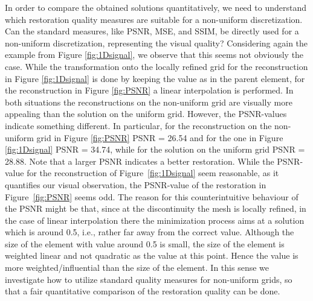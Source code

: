 \documentclass[enabledeprecatedfontcommands,cleardoublepage=empty,headsepline,twoside,11pt,DIV=15,BCOR=12mm,final]{scrartcl}
\begin{document}
 In order to compare the obtained solutions quantitatively, we need to understand which restoration quality measures are suitable for a non-uniform discretization. Can the standard measures, like PSNR, MSE, and SSIM, be directly used for a non-uniform discretization, representing the visual quality? Considering again the example from Figure \ref{fig:1Dsignal}, we observe that this seems not obviously the case. While the transformation onto the locally refined grid for the reconstruction in Figure \ref{fig:1Dsignal} is done by keeping the value as in the parent element, for the reconstruction in Figure \ref{fig:PSNR} a linear interpolation is performed. In both situations the reconstructions on the non-uniform grid are visually more appealing than the solution on the uniform grid. However, the PSNR-values indicate something different. In particular, for the reconstruction on the non-uniform grid in Figure \ref{fig:PSNR} PSNR = 26.54 and for the one in Figure \ref{fig:1Dsignal} PSNR = 34.74, while for the solution on the uniform grid PSNR = 28.88. Note that a larger PSNR indicates a better restoration. While the PSNR-value for the reconstruction of Figure~\ref{fig:1Dsignal} seem reasonable, as it quantifies our visual observation, the PSNR-value of the restoration in Figure~\ref{fig:PSNR} seems odd. The reason for this counterintuitive behaviour of the PSNR might be that, since at the discontinuity the mesh is locally refined, in the case of linear interpolation there the minimization process aims at a solution which is around 0.5, i.e., rather far away from the correct value. Although the size of the element with value around 0.5 is small, the size of the element is weighted linear and not quadratic as the value at this point. Hence the value is more weighted/influential than the size of the element. In this sense we investigate how to utilize standard quality measures for non-uniform grids, so that a fair quantitative comparison of the restoration quality can be done. %

\end{document}
